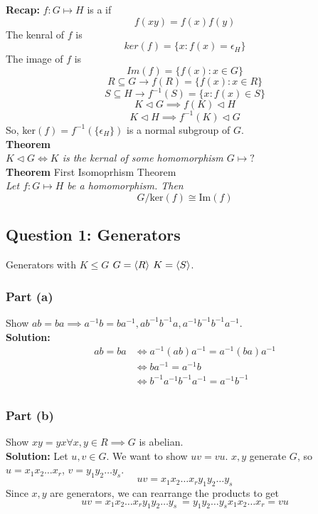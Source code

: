 \documentclass[openany]{report}
\begin{document}
\chapter{}
\textbf{Recap:}
$f: G \mapsto H$ is a  if 
\[f(xy) = f(x)f(y)\]
The kenral of $f$ is 
\[ker(f) = \{x: f(x)  = \epsilon_H\}\]
The image of $f$ is
\[Im(f) = \{f(x) : x \in G\}\]
\[R \subseteq G \rightarrow f(R) = \{f(x) : x \in R\}\]
\[S \subseteq H \rightarrow f^{-1}(S) = \{x : f(x) \in S\}\]
\[K \triangleleft G \implies f(K) \triangleleft H\]
\[K \triangleleft H \implies f^{-1}(K) \triangleleft G\]
So, ker$(f) = f^{-1}(\{\epsilon_H\})$ is a normal subgroup of $G$. \\[3ex]
\noindent
\textbf{Theorem}\\[1ex]
\textit{
    $K \triangleleft G \iff K$ is the kernal of some homomorphism $G \mapsto ?$}\\[2ex]
\noindent
\textbf{Theorem} First Isomoprhism Theorem\\[1ex]
   \textit{ Let $f: G \mapsto H$ be a homomorphism. Then}
    \[G / \text{ker}(f) \cong \text{Im}(f)\] 

\section{Question 1: Generators}
Generators with $K \leq G$ $G = \langle R \rangle$ $K = \langle S \rangle$.
\subsection{Part (a)}
Show $ab = ba \implies a^{-1}b = ba^{-1}, ab^{-1}b^{-1}a, a^{-1}b^{-1}b^{-1}a^{-1}$. \\[2ex]
\textbf{Solution:}
    \begin{align*}
        ab = ba &\iff a^{-1}(ab)a^{-1} = a^{-1}(ba)a^{-1}\\
        &\iff ba^{-1} = a^{-1}b\\
        &\iff b^{-1}a^{-1}b^{-1}a^{-1} = a^{-1}b^{-1}\\
    \end{align*}

\subsection{Part (b)}
Show $xy = yx \forall x,y \in R \implies G$ is abelian. \\[2ex]

\textbf{Solution: }
Let $u ,v \in G$. We want to show $uv = vu$. $x,y$ generate $G$, so $u = x_1x_2\ldots x_r$, $v = y_1y_2\ldots y_s$. 
\[uv = x_1x_2\ldots x_ry_1y_2 \ldots y_s\]
Since $x,y$ are generators, we can rearrange the products to get 
\[uv = x_1x_2\ldots x_ry_1y_2 \ldots y_s\ = y_1y_2\ldots y_sx_1x_2\ldots x_r = vu\]
\end{document}
